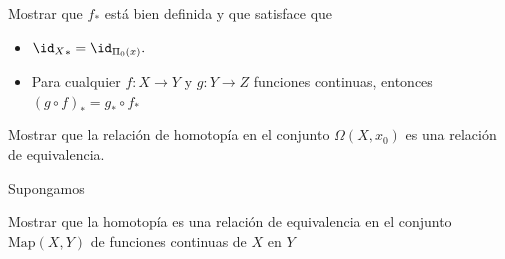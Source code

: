 \begin{ejercicio}
    Mostrar que $f_*$ está bien definida y que satisface que
    \begin{itemize}
        \item [(1)] ${\id_X}_*=\id_{\Pi_0(x)}.$
        \item [(2)] Para cualquier $f:X\to Y$ y $g:Y\to Z$ funciones continuas, entonces $(g\circ f)_*=g_*\circ f_*$
    \end{itemize}
\end{ejercicio}

\begin{ejercicio}
    Mostrar que la relación de homotopía en el conjunto $\Omega(X,x_0)$ es una relación de equivalencia.
    \begin{dem}
        Supongamos
    \end{dem}
\end{ejercicio}

\begin{ejercicio}
        Mostrar que la homotopía es una relación de equivalencia en el conjunto $\text{Map}(X,Y)$ de funciones continuas de $X$ en $Y$
    \end{ejercicio}

